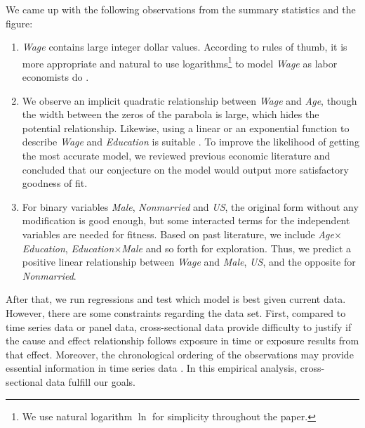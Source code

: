 \noindent We came up with the following observations from the summary statistics and the figure:
\begin{enumerate}
\item \textit{Wage} contains large integer dollar values. According to rules of thumb, it is more appropriate and natural to use logarithms\footnote{We use natural logarithm $\ln$ for simplicity throughout the paper.} to model \textit{Wage} as labor economists do \cite{stock_watson_2019, wooldridge_2020}.

\item We observe an implicit quadratic relationship between \textit{Wage} and \textit{Age}, though the width between the zeros of the parabola is large, which hides the potential relationship. Likewise, using a linear or an exponential function to describe \textit{Wage} and \textit{Education} is suitable \cite{wooldridge_2020}. To improve the likelihood of getting the most accurate model, we reviewed previous economic literature and concluded that our conjecture on the model would output more satisfactory goodness of fit.

\item For binary variables \textit{Male}, \textit{Nonmarried} and \textit{US}, the original form without any modification is good enough, but some interacted terms for the independent variables are needed for fitness. Based on past literature, we include \textit{Age}$\times$\textit{Education}, \textit{Education}$\times$\textit{Male} and so forth for exploration. Thus, we predict a positive linear relationship between \textit{Wage} and \textit{Male}, \textit{US}, and the opposite for \textit{Nonmarried}.
\end{enumerate}

After that, we run regressions and test which model is best given current data. However, there are some constraints regarding the data set. First, compared to time series data or panel data, cross-sectional data provide difficulty to justify if the cause and effect relationship follows exposure in time or exposure results from that effect. Moreover, the chronological ordering of the observations may provide essential information in time series data \cite{wooldridge_2020}. In this empirical analysis, cross-sectional data fulfill our goals.
